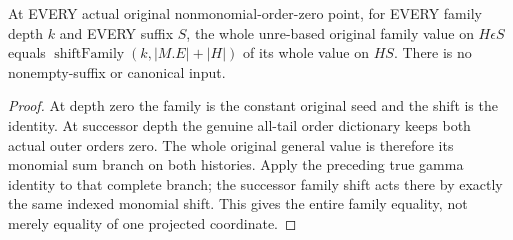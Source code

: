 \begin{theorem}
\label{hir:original-interior-all-tail-entire-family-monomial-leaf}
\leanok
At EVERY actual original nonmonomial-order-zero point, for EVERY family
depth $k$ and EVERY suffix $S$, the whole unre-based original family value
on $H\epsilon S$ equals $\operatorname{shiftFamily}(k,|M.E|+|H|)$ of its
whole value on $HS$. There is no nonempty-suffix or canonical input.
\end{theorem}
\begin{proof}
At depth zero the family is the constant original seed and the shift is the
identity. At successor depth the genuine all-tail order dictionary keeps
both actual outer orders zero. The whole original general value is therefore
its monomial sum branch on both histories. Apply the preceding true gamma
identity to that complete branch; the successor family shift acts there by
exactly the same indexed monomial shift. This gives the entire family equality,
not merely equality of one projected coordinate.
\end{proof}

